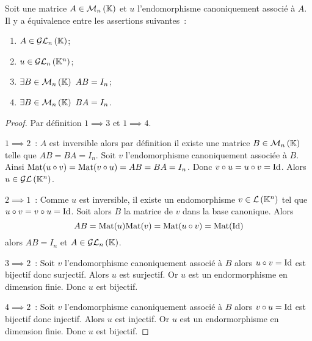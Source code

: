 \begin{theo}
  Soit une matrice \(A \in \mathcal{M}_{n}\left(\mathbb{K}\right)\) et \(u\) l'endomorphisme canoniquement
  associé à \(A\). Il y a équivalence entre les assertions suivantes~:
  \begin{enumerate}
    \item \(A \in \mathcal{GL}_{n}\left(\mathbb{K}\right)\);
    \item \(u \in \mathcal{GL}_{n}\left(\mathbb{K}^n\right)\);
    \item \(\exists B \in \Mn{n}{\K} \ AB=I_n\);
    \item \(\exists B \in \Mn{n}{\K} \ BA=I_n\).
  \end{enumerate}
\end{theo}
\begin{proof}
  Par définition \(1 \implies 3\) et \(1 \implies 4\).

  \(1 \implies 2\)~: \(A\) est inversible alors par définition il existe une
  matrice \(B \in \mathcal{M}_{n}\left(\mathbb{K}\right)\) telle que \(AB=BA=I_n\). Soit \(v\)
  l'endomorphisme canoniquement associée à \(B\). Ainsi \(\mathrm{Mat}(u \circ v) =
  \mathrm{Mat}(v \circ u) =AB=BA=I_n\). Donc \(v \circ u=u \circ v=\operatorname{Id}\). Alors \(u \in
  \mathcal{GL}\left(\mathbb{K}^n\right)\).

  \(2 \implies 1\)~: Comme \(u\) est inversible, il existe un endomorphisme \(v
  \in \mathcal{L}\left(\mathbb{K}^n\right)\) tel que \(u \circ v=v \circ u=\operatorname{Id}\). Soit alors \(B\) la
  matrice de \(v\) dans la base canonique. Alors
  \begin{equation}
    AB=\mathrm{Mat}(u) \mathrm{Mat}(v)=\mathrm{Mat}(u \circ v)=\mathrm{Mat}(\operatorname{Id})
  \end{equation}
  alors \(AB=I_n\) et \(A \in \mathcal{GL}_{n}\left(\mathbb{K}\right)\).

  \(3 \implies 2\)~: Soit \(v\) l'endomorphisme canoniquement associé à \(B\)
  alors \(u\circ v=\operatorname{Id}\) est bijectif donc surjectif. Alors \(u\) est surjectif.
  Or \(u\) est un endormorphisme en dimension finie. Donc \(u\) est bijectif.

  \(4 \implies 2\)~: Soit \(v\) l'endomorphisme canoniquement associé à \(B\)
  alors \(v\circ u=\operatorname{Id}\) est bijectif donc injectif. Alors \(u\) est injectif.
  Or \(u\) est un endormorphisme en dimension finie. Donc \(u\) est bijectif.
\end{proof}

